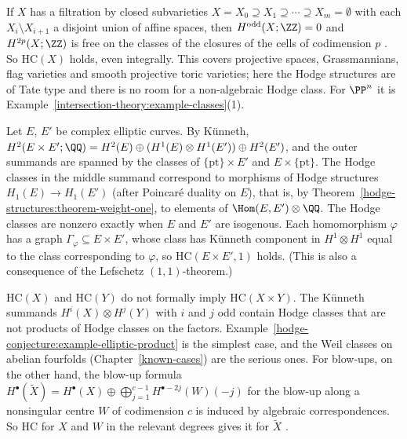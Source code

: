 \begin{example}\label{hodge-conjecture:example-cellular}
If $X$ has a filtration by closed subvarieties $X = X_0 \supseteq X_1 \supseteq \cdots \supseteq X_m = \emptyset$ with each $X_i \setminus X_{i+1}$ a disjoint union of affine spaces, then
$H^{\mathrm{odd}}(X; \ZZ) = 0$ and $H^{2p}(X; \ZZ)$ is free on the classes of the closures of the cells of codimension $p$ \cite[Example 19.1.11]{fulton-intersection}. So $\mathrm{HC}(X)$
holds, even integrally. This covers projective spaces, Grassmannians, flag varieties and smooth projective toric varieties; here the Hodge structures are of Tate type and there is
no room for a non-algebraic Hodge class. For $\PP^n$ it is Example~\ref{intersection-theory:example-classes}(1).
\end{example}

\begin{example}\label{hodge-conjecture:example-elliptic-product}
Let $E$, $E'$ be complex elliptic curves. By K\"unneth,
$H^2(E \times E'; \QQ) = H^2(E) \oplus (H^1(E) \otimes H^1(E')) \oplus H^2(E')$, and the outer summands are spanned by the classes of $\{\mathrm{pt}\} \times E'$ and $E \times \{\mathrm{pt}\}$.
The Hodge classes in the middle summand correspond to morphisms of Hodge structures $H_1(E) \to H_1(E')$ (after Poincar\'e duality on $E$), that is, by
Theorem~\ref{hodge-structures:theorem-weight-one}, to elements of $\Hom(E, E') \otimes \QQ$. The Hodge classes are nonzero exactly when $E$ and $E'$ are isogenous. Each homomorphism
$\varphi$ has a graph $\Gamma_\varphi \subseteq E \times E'$, whose class has K\"unneth component in $H^1 \otimes H^1$ equal to the class corresponding to $\varphi$, so $\mathrm{HC}(E \times E', 1)$ holds.
(This is also a consequence of the Lefschetz $(1,1)$-theorem.)
\end{example}

\begin{remark}\label{hodge-conjecture:remark-products}
$\mathrm{HC}(X)$ and $\mathrm{HC}(Y)$ do not formally imply $\mathrm{HC}(X \times Y)$. The K\"unneth summands $H^i(X) \otimes H^j(Y)$ with $i$ and $j$ odd contain Hodge classes that are not
products of Hodge classes on the factors. Example~\ref{hodge-conjecture:example-elliptic-product} is the simplest case, and the Weil classes on abelian fourfolds
(Chapter~\ref{known-cases}) are the serious ones. For blow-ups, on the other hand, the blow-up formula $H^\bullet(\tilde X) = H^\bullet(X) \oplus \bigoplus_{j=1}^{c-1}H^{\bullet-2j}(W)(-j)$ for the blow-up
along a nonsingular centre $W$ of codimension $c$ is induced by algebraic correspondences. So $\mathrm{HC}$ for $X$ and $W$ in the relevant degrees gives it for $\tilde X$ \cite[Theorem 7.31]{voisin-hodge-1}.
\end{remark}


